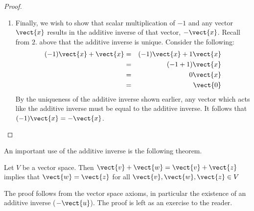\begin{proof}
\begin{enumerate}
\item
Finally, we wish to show that scalar multiplication of $-1$ and any vector $\vect{x}$ results in the additive inverse of that vector, $-\vect{x}$. Recall from $2$. above that the additive inverse is unique. 
Consider the following: 
\begin{eqnarray*}
(-1) \vect{x}+\vect{x} & =&(-1) \vect{x}+1\vect{x}\\
&=&(-1+1) \vect{x} \\
&=&0\vect{x} \\
&=&\vect{0}
\end{eqnarray*}
By the uniqueness of the additive inverse shown earlier, any vector which acts like the additive inverse must be equal to the additive inverse. It follows that $(-1) 
\vect{x}=-\vect{x}$.
\end{enumerate}
\end{proof}

An important use of the additive inverse is the following theorem.

\begin{theorem}{}{}
Let $V$ be a vector space. Then $\vect{v} + \vect{w} = \vect{v} + \vect{z}$ implies that $\vect{w} = \vect{z}$ for all $\vect{v}, \vect{w}, \vect{z} \in V$
\end{theorem}

The proof follows from the vector space axioms, in particular the existence of an additive inverse ($-\vect{u}$). The proof is left as an exercise to the reader. 
